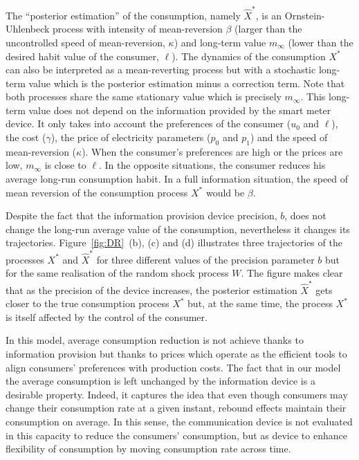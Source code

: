 \documentclass[a4paper,10pt]{article}
\theoremstyle{definition}
\theoremstyle{plain}
\numberwithin{equation}{section}
\begin{document}
The ``posterior estimation'' of the consumption, namely $\widehat X^\ast$, is an Ornstein-Uhlenbeck process with intensity of mean-reversion $\beta$ (larger than the uncontrolled speed of mean-reversion, $\kappa$) and long-term value $m_\infty$ (lower than the desired habit value of the consumer, $\ell$). The dynamics of the consumption $X^\ast$ can also be interpreted as a mean-reverting process but with a stochastic long-term value which is the posterior estimation minus a correction term.
Note that both processes share the same stationary value which is precisely $m_\infty$. 
This long-term value does not depend on the information provided by the smart meter device. It only takes into account the preferences of the consumer ($u_0$ and $\ell$), the cost  ($\gamma$), the price of electricity parameters ($p_0$ and $p_1$) and the speed of mean-reversion ($\kappa$). 
When the consumer's preferences are high or the prices are low, $m_\infty$ is close to $\ell$. 
In the opposite situations, the consumer reduces his average long-run consumption habit. 
In a full information situation, the  speed of mean reversion of the consumption process $X^*$ would be $\beta$.

Despite the fact that the information provision device precision, $b$, does not change the long-run average value of the consumption, nevertheless it changes its trajectories. Figure~\ref{fig:DR}~(b), (c) and (d) illustrates three trajectories of the processes $X^\ast$ and $\widehat X^\ast$ for three different values of the precision parameter $b$ but for the same realisation of the random shock process $W$. The figure makes clear that as the precision of the device increases, the posterior estimation $\widehat X ^\ast$ gets closer to the true consumption process $X^\ast$ but, at the same time, the process $X^\ast$ is itself affected by the control of the consumer. 

In this model, average consumption reduction is not achieve thanks to information provision but thanks to prices which operate as the efficient tools to align consumers' preferences with production costs. The fact that  in our model the average consumption is left unchanged by the information device is a desirable property. Indeed, it captures the idea that even though consumers may change their consumption rate at a given instant, rebound effects maintain their consumption  on average. In this sense, the communication device is not evaluated in this capacity to reduce the consumers' consumption, but as device to enhance flexibility of consumption by moving consumption rate across time.
\end{document}

